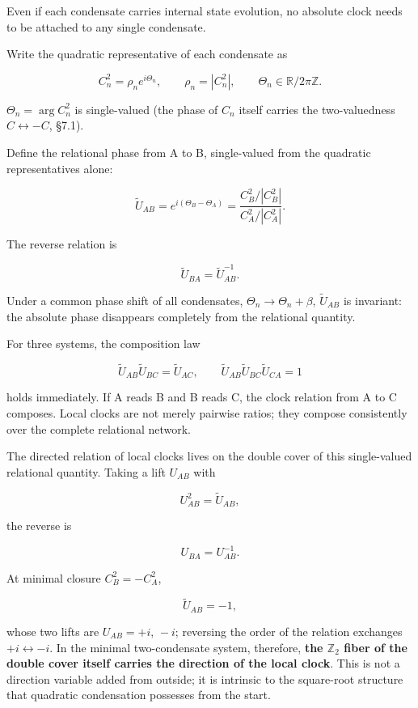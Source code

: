 \documentclass[
  a4paper,
]{article}
\begin{document}
Even if each condensate carries internal state evolution, no absolute
clock needs to be attached to any single condensate.

Write the quadratic representative of each condensate as

\[
C_n^2=\rho_n e^{i\Theta_n},
\qquad
\rho_n=|C_n^2|,
\qquad
\Theta_n\in\mathbb R/2\pi\mathbb Z.
\]

\(\Theta_n=\arg C_n^2\) is single-valued (the phase of \(C_n\) itself
carries the two-valuedness \(C\leftrightarrow-C\), §7.1).

Define the relational phase from A to B, single-valued from the
quadratic representatives alone:

\[
\boxed{
\tilde U_{AB}
=
e^{i(\Theta_B-\Theta_A)}
=
\frac{C_B^2/|C_B^2|}{C_A^2/|C_A^2|}
}.
\]

The reverse relation is

\[
\boxed{
\tilde U_{BA}=\tilde U_{AB}^{-1}
}.
\]

Under a common phase shift of all condensates,
\(\Theta_n\to\Theta_n+\beta\), \(\tilde U_{AB}\) is invariant: the
absolute phase disappears completely from the relational quantity.

For three systems, the composition law

\[
\boxed{
\tilde U_{AB}\tilde U_{BC}=\tilde U_{AC}
},
\qquad
\boxed{
\tilde U_{AB}\tilde U_{BC}\tilde U_{CA}=1
}
\]

holds immediately. If A reads B and B reads C, the clock relation from A
to C composes. Local clocks are not merely pairwise ratios; they compose
consistently over the complete relational network.

The directed relation of local clocks lives on the double cover of this
single-valued relational quantity. Taking a lift \(U_{AB}\) with

\[
\boxed{
U_{AB}^2=\tilde U_{AB}
},
\]

the reverse is

\[
\boxed{
U_{BA}=U_{AB}^{-1}
}.
\]

At minimal closure \(C_B^2=-C_A^2\),

\[
\tilde U_{AB}=-1,
\]

whose two lifts are \(U_{AB}=+i,\,-i\); reversing the order of the
relation exchanges \(+i\leftrightarrow-i\). In the minimal
two-condensate system, therefore, \textbf{the \(\mathbb Z_2\) fiber of
the double cover itself carries the direction of the local clock}. This
is not a direction variable added from outside; it is intrinsic to the
square-root structure that quadratic condensation possesses from the
start.
\end{document}

